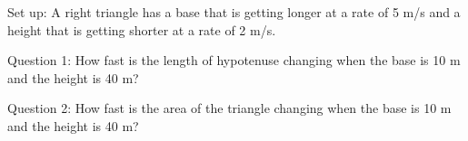 \documentclass[11pt,fleqn]{article}
\begin{document}
\setlength{\parindent}{0cm}
\renewcommand{\headrulewidth}{0pt}
\newcommand{\blank}[1]{\rule{#1}{0.75pt}}
\renewcommand{\d}{\displaystyle}
\vspace*{-0.7in}
\begin{center}
 {\large{ }}
\end{center}
 Set up: A right triangle has a base that is getting longer at a rate of 5 m/s and a height that is getting shorter at a rate of 2 m/s. \\
 
 
 
 \vfill
 
 Question 1: How fast is the length of hypotenuse changing when the base is 10 m and the height is 40 m?
 
 \vfill
 
 Question 2: How fast is the area of the  triangle changing when the base is 10 m and the height is 40 m?
 
 \vfill
\end{document}
